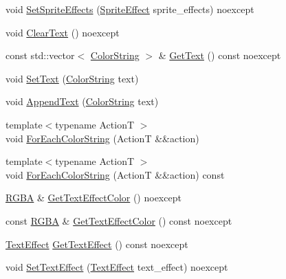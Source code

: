 \begin{DoxyCompactItemize}
\item 
void \mbox{\hyperlink{classmage_1_1rendering_1_1_sprite_text_a0d2f1e88db1e1fec1b7c6b2563ef7271}{Set\+Sprite\+Effects}} (\mbox{\hyperlink{namespacemage_1_1rendering_a4dbc3536c87b906f1d41d863ec458e78}{Sprite\+Effect}} sprite\+\_\+effects) noexcept
\item 
void \mbox{\hyperlink{classmage_1_1rendering_1_1_sprite_text_a4458a9a429369d6cc0ed34eb93f3e632}{Clear\+Text}} () noexcept
\item 
const std\+::vector$<$ \mbox{\hyperlink{classmage_1_1rendering_1_1_color_string}{Color\+String}} $>$ \& \mbox{\hyperlink{classmage_1_1rendering_1_1_sprite_text_a3a07e4043ce7058cb157111738c664cb}{Get\+Text}} () const noexcept
\item 
void \mbox{\hyperlink{classmage_1_1rendering_1_1_sprite_text_a3e7bc7515af8cb92351b0bef475e7dbe}{Set\+Text}} (\mbox{\hyperlink{classmage_1_1rendering_1_1_color_string}{Color\+String}} text)
\item 
void \mbox{\hyperlink{classmage_1_1rendering_1_1_sprite_text_a3b61f48d6001d8a7adf44d946797399b}{Append\+Text}} (\mbox{\hyperlink{classmage_1_1rendering_1_1_color_string}{Color\+String}} text)
\item 
{\footnotesize template$<$typename ActionT $>$ }\\void \mbox{\hyperlink{classmage_1_1rendering_1_1_sprite_text_a09b0f98a4be62a6b271f4adfce01ea07}{For\+Each\+Color\+String}} (ActionT \&\&action)
\item 
{\footnotesize template$<$typename ActionT $>$ }\\void \mbox{\hyperlink{classmage_1_1rendering_1_1_sprite_text_a4d53ac7323640025e6ef78f3863703d3}{For\+Each\+Color\+String}} (ActionT \&\&action) const
\item 
\mbox{\hyperlink{structmage_1_1_r_g_b_a}{R\+G\+BA}} \& \mbox{\hyperlink{classmage_1_1rendering_1_1_sprite_text_aa5cd1f28efdf8508474dd962e8733783}{Get\+Text\+Effect\+Color}} () noexcept
\item 
const \mbox{\hyperlink{structmage_1_1_r_g_b_a}{R\+G\+BA}} \& \mbox{\hyperlink{classmage_1_1rendering_1_1_sprite_text_a7705f00b0172153d52f31f170b12968f}{Get\+Text\+Effect\+Color}} () const noexcept
\item 
\mbox{\hyperlink{classmage_1_1rendering_1_1_sprite_text_af07ecf28d2ab8997c011cab74e799ef7}{Text\+Effect}} \mbox{\hyperlink{classmage_1_1rendering_1_1_sprite_text_a7c61e9d50bb6c3c46507706e1aad8d5c}{Get\+Text\+Effect}} () const noexcept
\item 
void \mbox{\hyperlink{classmage_1_1rendering_1_1_sprite_text_a0870da91f8c11f63c09bf6de1bce4ce3}{Set\+Text\+Effect}} (\mbox{\hyperlink{classmage_1_1rendering_1_1_sprite_text_af07ecf28d2ab8997c011cab74e799ef7}{Text\+Effect}} text\+\_\+effect) noexcept

\end{DoxyCompactItemize}
